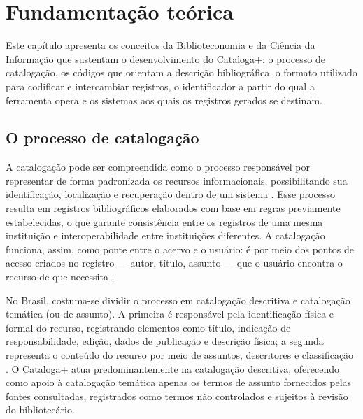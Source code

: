 
\chapter{Fundamentação teórica}
\label{cap:fundamentacao}

Este capítulo apresenta os conceitos da Biblioteconomia e da Ciência da Informação que sustentam o desenvolvimento do Cataloga+: o processo de catalogação, os códigos que orientam a descrição bibliográfica, o formato utilizado para codificar e intercambiar registros, o identificador a partir do qual a ferramenta opera e os sistemas aos quais os registros gerados se destinam.

\section{O processo de catalogação}
\label{sec:catalogacao}

A catalogação pode ser compreendida como o processo responsável por representar de forma padronizada os recursos informacionais, possibilitando sua identificação, localização e recuperação dentro de um sistema \cite{mey2009}. Esse processo resulta em registros bibliográficos elaborados com base em regras previamente estabelecidas, o que garante consistência entre os registros de uma mesma instituição e interoperabilidade entre instituições diferentes. A catalogação funciona, assim, como ponte entre o acervo e o usuário: é por meio dos pontos de acesso criados no registro --- autor, título, assunto --- que o usuário encontra o recurso de que necessita \cite{svenonius2000}.

No Brasil, costuma-se dividir o processo em catalogação descritiva e catalogação temática (ou de assunto). A primeira é responsável pela identificação física e formal do recurso, registrando elementos como título, indicação de responsabilidade, edição, dados de publicação e descrição física; a segunda representa o conteúdo do recurso por meio de assuntos, descritores e classificação \cite{mey2009}. O Cataloga+ atua predominantemente na catalogação descritiva, oferecendo como apoio à catalogação temática apenas os termos de assunto fornecidos pelas fontes consultadas, registrados como termos não controlados e sujeitos à revisão do bibliotecário.

